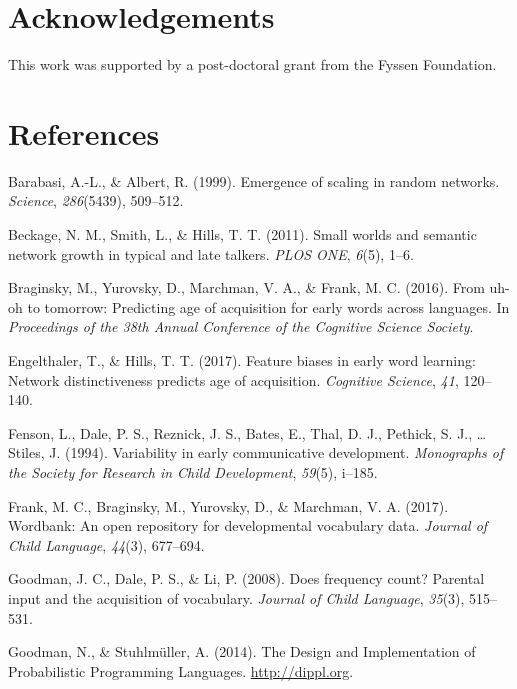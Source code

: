 \documentclass[10pt, letterpaper]{article}
\begin{document}
\section{Acknowledgements}\label{acknowledgements}

This work was supported by a post-doctoral grant from the Fyssen
Foundation.

\section{References}\label{references}

\setlength{\parindent}{-0.1in} \setlength{\leftskip}{0.125in} \noindent

\hypertarget{refs}{}
\hypertarget{ref-barabasi99}{}
Barabasi, A.-L., \& Albert, R. (1999). Emergence of scaling in random
networks. \emph{Science}, \emph{286}(5439), 509--512.

\hypertarget{ref-beckage2011}{}
Beckage, N. M., Smith, L., \& Hills, T. T. (2011). Small worlds and
semantic network growth in typical and late talkers. \emph{PLOS ONE},
\emph{6}(5), 1--6.

\hypertarget{ref-braginsky2016}{}
Braginsky, M., Yurovsky, D., Marchman, V. A., \& Frank, M. C. (2016).
From uh-oh to tomorrow: Predicting age of acquisition for early words
across languages. In \emph{Proceedings of the 38th Annual Conference of
the Cognitive Science Society}.

\hypertarget{ref-engelthaler2017}{}
Engelthaler, T., \& Hills, T. T. (2017). Feature biases in early word
learning: Network distinctiveness predicts age of acquisition.
\emph{Cognitive Science}, \emph{41}, 120--140.

\hypertarget{ref-fenson94}{}
Fenson, L., Dale, P. S., Reznick, J. S., Bates, E., Thal, D. J.,
Pethick, S. J., \ldots{} Stiles, J. (1994). Variability in early
communicative development. \emph{Monographs of the Society for Research
in Child Development}, \emph{59}(5), i--185.

\hypertarget{ref-frank2017}{}
Frank, M. C., Braginsky, M., Yurovsky, D., \& Marchman, V. A. (2017).
Wordbank: An open repository for developmental vocabulary data.
\emph{Journal of Child Language}, \emph{44}(3), 677--694.

\hypertarget{ref-goodman2008}{}
Goodman, J. C., Dale, P. S., \& Li, P. (2008). Does frequency count?
Parental input and the acquisition of vocabulary. \emph{Journal of Child
Language}, \emph{35}(3), 515--531.

\hypertarget{ref-dippl}{}
Goodman, N., \& Stuhlmüller, A. (2014). The Design and Implementation of
Probabilistic Programming Languages. \url{http://dippl.org}.
\end{document}
